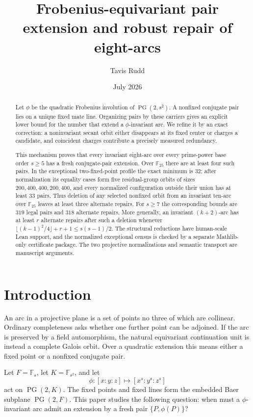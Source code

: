 \documentclass[11pt]{article}
\title{Frobenius-equivariant pair extension and robust repair of
eight-arcs}
\author{Tavis Rudd}
\date{July 2026}
\theoremstyle{definition}
\theoremstyle{remark}
\newcommand{\PG}{\operatorname{PG}}
\newcommand{\F}{\mathbb{F}}
\begin{document}
\maketitle

\begin{abstract}
Let $\phi$ be the quadratic Frobenius involution of $\PG(2,s^2)$.  A
nonfixed conjugate pair lies on a unique fixed mate line.  Organizing pairs
by these carriers gives an explicit lower bound for the number that extend a
$\phi$-invariant arc.  We refine it by an exact correction: a noninvariant
secant orbit either disappears at its fixed center or charges a candidate,
and coincident charges contribute a precisely measured redundancy.

This mechanism proves that every invariant eight-arc over every prime-power
base order $s\ge5$ has a fresh conjugate-pair extension.  Over $\F_{25}$
there are at least four such pairs.  In the exceptional two-fixed-point
profile the exact minimum is $32$; after normalization its equality cases
form five residual-group orbits of sizes $200,400,400,200,400$, and every
normalized configuration outside their union has at least $33$ pairs.  Thus deletion
of any selected nonfixed orbit from an invariant ten-arc over $\F_{25}$
leaves at least three alternate repairs.  For $s\ge7$ the corresponding
bounds are $319$ legal pairs and $318$ alternate repairs.  More generally,
an invariant $(k+2)$-arc has at least $r$ alternate repairs after such a
deletion whenever
$\lfloor(k-1)^2/4\rfloor+r+1\le s(s-1)/2$.  The structural reductions have
human-scale Lean support, and the normalized exceptional census is checked by
a separate Mathlib-only certificate package.  The two projective
normalizations and semantic transport are manuscript arguments.
\end{abstract}

\section{Introduction}

An arc in a projective plane is a set of points no three of which are
collinear.  Ordinary completeness asks whether one further point can be
adjoined.  If the arc is preserved by a field automorphism, the natural
equivariant continuation unit is instead a complete Galois orbit.  Over a
quadratic extension this means either a fixed point or a nonfixed conjugate
pair.

Let $F=\F_s$, let $K=\F_{s^2}$, and let
\[
  \phi\colon [x:y:z]\longmapsto[x^s:y^s:z^s]
\]
act on $\PG(2,K)$.  The fixed points and fixed lines form the embedded Baer
subplane $\PG(2,F)$.  This paper studies the following question: when must a
$\phi$-invariant arc admit an extension by a fresh pair
$\{P,\phi(P)\}$?
\end{document}

